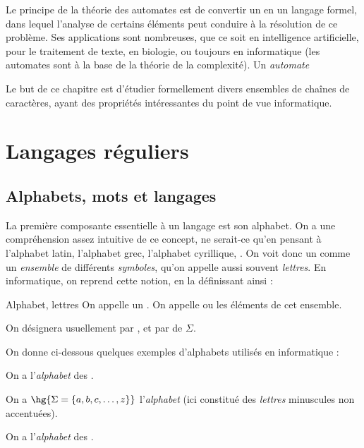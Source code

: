 \documentclass[a4paper,french,bookmarks]{book}
\newcommand{\chaptertoc}[0]{
    \setcounter{tocdepth}{2}
    \begin{tcolorbox}[
        enhanced,
        frame hidden,
        sharp corners,
        detach title,
        spread outwards     = 5pt,
        halign              = center,
        valign              = center,
        borderline west     = {3pt}{0pt}{main20!50!main2!95!gray!90},
        coltitle            = main20!50!main2!95!gray!90, 
        interior style      = {
            left color      = main1white2!65!gray!11,
            middle color    = main1white2!50!gray!10,
            right color     = main1white2!35!gray!9
        },
        arc                 = 0 cm,
        title               = SOMMAIRE,
        boxrule             = 0pt,
        fonttitle           = \bfseries\sffamily,
        overlay             = {
            \node[rotate=90, minimum width=1cm, anchor=south,yshift=-0.8cm]
            at (frame.west) {\tcbtitle};
        }
    ]
        \begin{minipage}{0.83\linewidth}
            \sffamily
            \minitoc
        \end{minipage}
    \end{tcolorbox}
}
\begin{document}
    Le principe de la théorie des automates est de convertir un  en un langage formel, dans lequel l'analyse de certains éléments peut conduire à la résolution de ce problème. Ses applications sont nombreuses, que ce soit en intelligence artificielle, pour le traitement de texte, en biologie, ou toujours en informatique (les automates sont à la base de la théorie de la complexité). Un \textit{automate} 
    
    

    Le but de ce chapitre est d'étudier formellement divers ensembles de
    chaînes de caractères, ayant des propriétés intéressantes du point de vue informatique.
    
    \chaptertoc
    
    \section{Langages réguliers}
    
    \subsection{Alphabets, mots et langages}
    
    La première composante essentielle à un langage est son alphabet. On a une compréhension assez intuitive de ce concept, ne serait-ce qu'en pensant à l'alphabet latin, l'alphabet grec, l'alphabet cyrillique, \etc. On voit donc un  comme un \textit{ensemble} de différents \textit{symboles}, qu'on appelle aussi souvent \textit{lettres}. En informatique, on reprend cette notion, en la définissant ainsi :
        
    \begin{definition}{Alphabet, lettres}{}
        On appelle  un . On appelle  ou  les éléments de cet ensemble.
    \end{definition}
    \begin{notation}
        On désignera usuellement par , et par  de $\Sigma$.
    \end{notation}
    
    On donne ci-dessous quelques exemples d'alphabets utilisés en informatique :
    
    \begin{example}{}{}
        \begin{enumerate}
            \itt On a  l'\textit{alphabet} des .
            
            \itt On a $\hg{\Sigma = \ens{a, b, c, \dots, z}}$ l'\textit{alphabet}  (ici constitué des \textit{lettres} minuscules non accentuées).
            
            \itt On a l'\textit{alphabet} des .
        \end{enumerate}
    \end{example}
    
\end{document}
